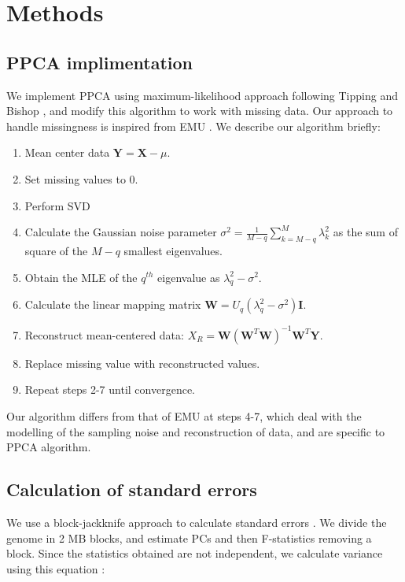 \documentclass[12pt, letterpaper]{article}
\newcommand{\BY}{\mathbf{Y}}
\newcommand{\BW}{\mathbf{W}}
\newcommand{\BI}{\mathbf{I}}
\newcommand{\MX}{\mathbf{X}}
\begin{document}
\section{Methods}

\subsection{PPCA implimentation}\label{method-ppca}

We implement PPCA using maximum-likelihood approach following Tipping and                Bishop \cite{tipping_probabilistic_nodate}, and modify this algorithm to work with missing data. Our approach to handle missingness is inspired from EMU \cite{meisner_large-scale_2021}. We describe our algorithm briefly:
\begin{enumerate}
    \item Mean center data $\BY = \MX - \mu$.
    \item Set missing values to 0.
    \item Perform SVD
    \item Calculate the Gaussian noise parameter $\sigma^2 = \frac{1}{M-q} \sum_{k=M-q}^ M \lambda_k^2$ as the sum of square of the $M-q$ smallest eigenvalues.
    \item Obtain the MLE of the $q^{th}$ eigenvalue as $\lambda_q^2 - \sigma^2$.
    \item Calculate the linear mapping matrix $\BW = U_q (\lambda_q^2 - \sigma^2)\BI$.
    \item Reconstruct mean-centered data: $X_R = \BW(\BW^T\BW)^{-1}\BW^T\BY$.
    \item Replace missing value with reconstructed values.
    \item Repeat steps 2-7 until convergence.
\end{enumerate}

Our algorithm differs from that of EMU at steps 4-7, which deal with the modelling of the sampling noise and reconstruction of data, and are specific to PPCA algorithm.

\subsection{Calculation of standard errors}

We use a block-jackknife approach to calculate standard errors \cite{maier_limits_2022}. We divide the genome in 2 MB blocks, and estimate PCs and then F-statistics removing a block. Since the statistics obtained are not independent, we calculate variance using this equation \cite{maier_limits_2022}:
\end{document}
